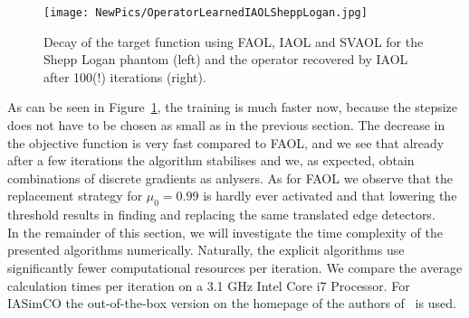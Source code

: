 \documentclass[11pt, onecolumn, journal,compsoc]{IEEEtran}
\theoremstyle{plain}
\theoremstyle{remark}
\begin{document}
{
	\begin{figure}[h!]
		\centering
		\quad
		\texttt{[image: NewPics/OperatorLearnedIAOLSheppLogan.jpg]}
		
		\caption{Decay of the target function using FAOL, IAOL and SVAOL for the Shepp Logan phantom (left) and the operator recovered by IAOL after 100(!) iterations (right).}
		\label{fig:LearnedOpISAOL}
\end{figure}}


%
As can be seen in Figure~\ref{fig:LearnedOpISAOL}, the training is much faster now, because the stepsize does not have to be chosen as small as in the previous section. The decrease in the objective function is very fast compared to FAOL, and we see that already after a few iterations the algorithm stabilises and we, as expected, obtain combinations of discrete gradients as anlysers. As for FAOL we observe that the replacement strategy for $\mu_0=0.99$ is hardly ever activated and that lowering the threshold results in finding and replacing the same translated edge detectors.\\
In the remainder of this section, we will investigate the time complexity of the presented algorithms numerically. Naturally, the explicit algorithms use significantly fewer computational resources per iteration. We compare the average calculation times per iteration on a  3.1 GHz Intel Core i7 Processor. For IASimCO the out-of-the-box version on the homepage of the authors of~\cite{dowadaplha16} is used.
\end{document}

